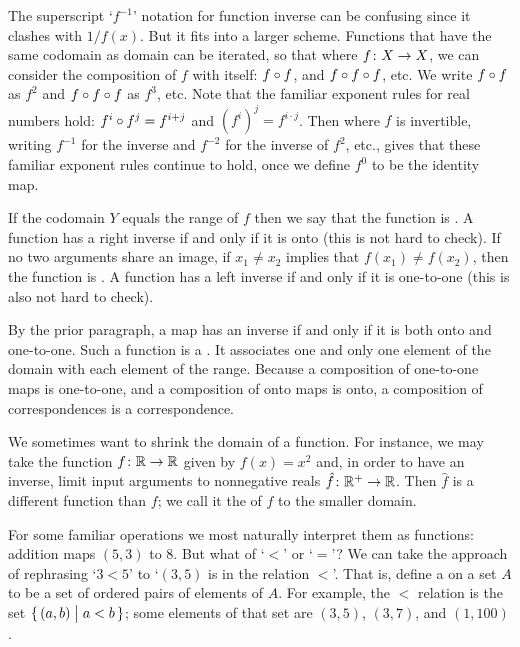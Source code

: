 The superscript `\( f^{-1} \)' notation for function inverse can be 
confusing since it clashes with \( 1/f(x) \).
But it fits into a larger scheme.
Functions that have the same codomain as domain can be iterated,
so that where $\mbox{$f\colon X\to X$}$, we can consider
the composition of $f$ with itself: \( f\mathbin\circ f \), 
and \( f\mathbin\circ f\mathbin\circ f \), etc.
We 
write $f\mathbin\circ f$ as \( f^2 \) and 
$f\mathbin\circ f\mathbin\circ f$ as \( f^3 \), etc.
Note that the familiar exponent rules for real numbers hold:
\( f^i\mathbin\circ f^j=f^{i+j} \) and \( (f^i)^j=f^{i\cdot j} \).
Then where \( f \) is invertible,
writing \( f^{-1} \) for the inverse
and \( f^{-2} \) for the inverse of \( f^2 \), etc., gives that
these familiar exponent rules continue to hold, once we define
\( f^0 \) to be the identity map.

If the codomain \( Y \) equals the range of \( f \) then 
we say that the function is
.
A function has a right inverse if and only if it is onto 
(this is not hard to check).
If no two arguments share an image, if
\( x_1\neq x_2 \) implies  that \( f(x_1)\neq f(x_2) \), then the function is
.
A function has a left inverse if and only if it is one-to-one (this is also 
not hard to check).

By the prior paragraph, a map has an inverse if and only if it is both
onto and one-to-one. 
Such a function is a 
.
It associates one and only one element of the domain with each element of the
range.
Because a composition of one-to-one maps is one-to-one, and a composition
of onto maps is onto, a composition of correspondences is a
correspondence.

We sometimes want to shrink the domain of a function.
For instance, we may take the function \( \mbox{$f\colon \mathbb{R}\to \mathbb{R}$} \) given by
\( f(x)=x^2 \) and, in order to have an inverse, limit input arguments to
nonnegative reals \( \mbox{$\hat{f}\colon \mathbb{R}^+\to \mathbb{R}$} \).
Then \( \hat{f} \) is a different function than \( f \); we call it
the  of
\( f \) to the smaller domain.








For some familiar operations we most naturally interpret them as functions:
addition maps \( (5,3) \) to \( 8 \).
But what of `\( < \)' or `\( = \)'?
We can take the approach of rephrasing `\( 3<5 \)' to `\( (3,5) \) is
in the relation \( < \)'.
That is, define a  on a set \( A \) to be
a set of ordered pairs of elements of \( A \).
For example, the \( < \) relation is the set
\(  \mbox{$\{\,(a,b)\bigm| a<b\,\}$} \); some elements of that set are
\( (3,5) \), \( (3,7) \), and \( (1,100) \).

